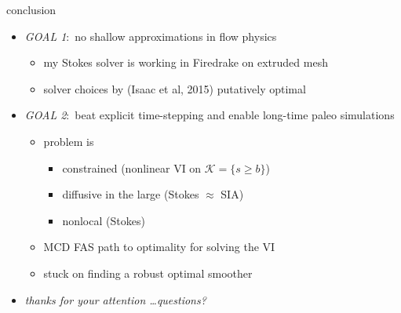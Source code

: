 \documentclass[usepdftitle=false,usenames,dvipsnames]{beamer}
\begin{document}
\begin{frame}{conclusion}

\begin{itemize}
\item \emph{GOAL 1}:\, no shallow approximations in flow physics {\Large \strut} 
    \begin{itemize}
    \item<2-3> my Stokes solver is working in Firedrake on extruded mesh
    \item<2-3> solver choices by (Isaac et al, 2015) putatively optimal
    \end{itemize}
\item \emph{GOAL 2}:\, beat explicit time-stepping and enable long-time paleo simulations {\Large \strut} 
    \begin{itemize}
    \item<2-3> problem is
        \begin{itemize}
        \item<2-3>[{\color{black} $\circ$}] constrained (nonlinear VI on $\mathcal{K} = \{s\ge b\}$)
        \item<2-3>[{\color{black} $\circ$}] diffusive in the large (Stokes $\approx$ SIA)
        \item<2-3>[{\color{black} $\circ$}] nonlocal (Stokes)
        \end{itemize}
    \item<2-3> {\color{ForestGreen} MCD FAS path to optimality for solving the VI}
    \item<3> \alert{stuck on finding a robust optimal smoother}
    \end{itemize}

\normalsize
\bigskip\bigskip
\item<3> \emph{thanks for your attention \dots questions?}
\end{itemize}
\end{frame}



\end{document}
